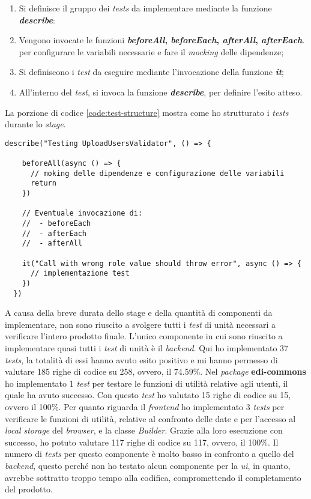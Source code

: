 \begin{enumerate}
  \item Si definisce il gruppo dei \emph{tests} da implementare mediante la funzione \textbf{\emph{describe}}:
  \item Vengono invocate le funzioni \textbf{\emph{beforeAll}, \emph{beforeEach}, \emph{afterAll}, \emph{afterEach}}. per configurare le variabili necessarie e fare il \emph{mocking} delle dipendenze;
  \item Si definiscono i \emph{test} da eseguire mediante l'invocazione della funzione \emph{\textbf{it}};
  \item All'interno del \emph{test}, si invoca la funzione \emph{\textbf{describe}}, per definire l'esito atteso.
\end{enumerate}

La porzione di codice \ref{code:test-structure} mostra come ho strutturato i \emph{tests} durante lo \emph{stage}.

\begin{lstlisting}[caption=Esempio di struttura di \emph{test}, label={code:test-structure}, captionpos=b]
  describe("Testing UploadUsersValidator", () => {

    beforeAll(async () => {
      // moking delle dipendenze e configurazione delle variabili
      return 
    })

    // Eventuale invocazione di:
    //  - beforeEach
    //  - afterEach
    //  - afterAll

    it("Call with wrong role value should throw error", async () => {
      // implementazione test
    })
  })
\end{lstlisting}


A causa della breve durata dello stage e della quantità di componenti da implementare, non sono riuscito a svolgere tutti i \emph{test} di unità necessari a verificare l'intero prodotto finale.
L'unico componente in cui sono riuscito a implementare quasi tutti i \emph{test} di unità è il \emph{\gls{backend}}.
Qui ho implementato 37 \emph{tests}, la totalità di essi hanno avuto esito positivo e mi hanno permesso di valutare 185 righe di codice su 258, ovvero, il 74.59\%.
Nel \emph{package} \textbf{edi-commons} ho implementato 1 \emph{test} per testare le funzioni di utilità relative agli utenti, il quale ha avuto successo. 
Con questo \emph{test} ho valutato 15 righe di codice su 15, ovvero il 100\%.
Per quanto riguarda il \emph{\gls{frontend}} ho implementato 3 \emph{tests} per verificare le funzioni di utilità, relative al confronto delle date e per l'accesso al \emph{local storage} del \emph{browser}, e la classe \emph{Builder}.
Grazie alla loro esecuzione con successo, ho potuto valutare 117 righe di codice su 117, ovvero, il 100\%.
Il numero di \emph{tests} per questo componente è molto basso in confronto a quello del \emph{\gls{backend}}, questo perché non ho testato alcun componente per la \emph{\acrshort{ui}}, in quanto, avrebbe sottratto troppo tempo alla codifica, compromettendo il completamento del prodotto.

